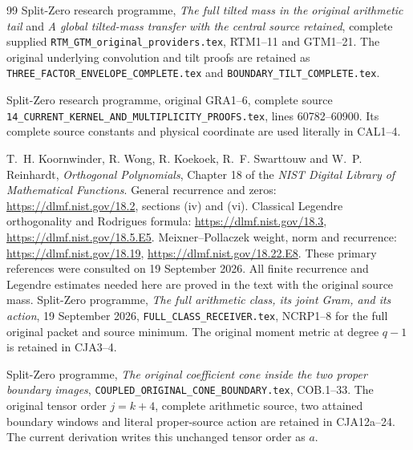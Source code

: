 \begin{thebibliography}{99}
Split-Zero research programme, \emph{The full tilted mass in the
original arithmetic tail} and \emph{A global tilted-mass transfer
with the central source retained}, complete supplied
\texttt{RTM\_GTM\_original\_providers.tex}, RTM1--11 and GTM1--21.
The original underlying convolution and tilt proofs are retained
as \texttt{THREE\_FACTOR\_ENVELOPE\_COMPLETE.tex} and
\texttt{BOUNDARY\_TILT\_COMPLETE.tex}.

Split-Zero research programme, original GRA1--6, complete source
\texttt{14\_CURRENT\_KERNEL\_AND\_MULTIPLICITY\_PROOFS.tex},
lines 60782--60900. Its complete source constants and physical
coordinate are used literally in CAL1--4.

T.~H. Koornwinder, R. Wong, R. Koekoek, R.~F. Swarttouw and
W.~P. Reinhardt, \emph{Orthogonal Polynomials}, Chapter 18 of the
\emph{NIST Digital Library of Mathematical Functions}.
General recurrence and zeros: \url{https://dlmf.nist.gov/18.2},
sections (iv) and (vi).
Classical Legendre orthogonality and Rodrigues formula:
\url{https://dlmf.nist.gov/18.3},
\url{https://dlmf.nist.gov/18.5.E5}.
Meixner--Pollaczek weight, norm and recurrence:
\url{https://dlmf.nist.gov/18.19},
\url{https://dlmf.nist.gov/18.22.E8}.
These primary references were consulted on 19 September 2026.
All finite recurrence and Legendre estimates needed here are
proved in the text with the original source mass.
Split-Zero programme,
\emph{The full arithmetic class, its joint Gram, and its action},
19 September 2026, \texttt{FULL\_CLASS\_RECEIVER.tex},
NCRP1--8 for the full original packet and source minimum.
The original moment metric at degree \(q-1\) is retained in CJA3--4.

Split-Zero programme,
\emph{The original coefficient cone inside the two proper boundary images},
\texttt{COUPLED\_ORIGINAL\_CONE\_BOUNDARY.tex}, COB.1--33.
The original tensor order \(j=k+4\), complete arithmetic source,
two attained boundary windows and literal proper-source action are
retained in CJA12a--24. The current derivation writes this unchanged
tensor order as \(a\).

\end{thebibliography}
